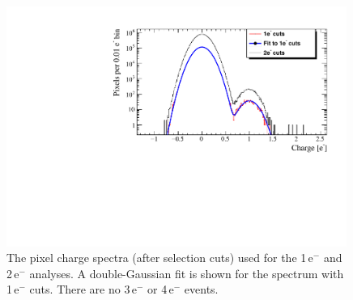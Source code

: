 \documentclass[aps,prl,twocolumn,showpacs,superscriptaddress,preprintnumbers]{revtex4-1}
\newcommand{\unit}[1]{\ensuremath{\mathrm{\,#1}}\xspace}
\newcommand{\e}{\unit{e^{-}}}
\begin{document}
%
\begin{figure}[!t]
\begin{center}
 \includegraphics[width=0.99\textwidth]{figs/spectrum.pdf}
 \end{center}
\caption{The pixel charge spectra (after selection cuts) used for the 1\e and 2\e analyses. A double-Gaussian fit is shown for the spectrum with 1\e cuts. There are no 3\e or 4\e events. 
}
\label{fig:spectra}
\end{figure}
%
\end{document}
